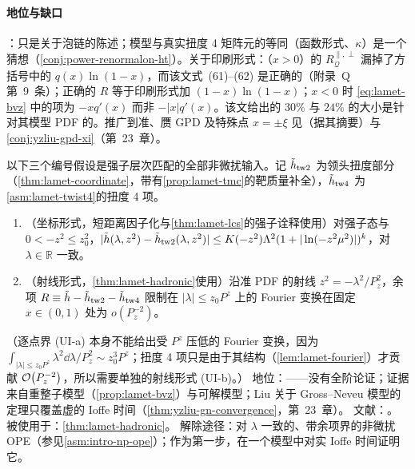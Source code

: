 \paragraph{地位与缺口}
\tagP：只是关于泡链的陈述；模型与真实扭度 4 矩阵元的等同（函数形式、$\kappa$）是一个猜想（\cref{conj:power-renormalon-ht}）。关于印刷形式：\cite[式~(63)--(64)]{Braun:2018brg}（$x>0$）的 $R^{\parallel,\perp}_{\mathcal Q}$ 漏掉了方括号中的 $q(x)\ln(1-x)$，而该文式~(61)--(62) 是正确的（附录~Q 第~9~条）；正确的 $R$ 等于印刷形式加 $(1-x)\ln(1-x)$；$x<0$ 时 \cref{eq:lamet-bvz} 中的项为 $-xq'(x)$ 而非 $-|x|q'(x)$。该文给出的 $30\%$ 与 $24\%$ 的大小是针对其模型 PDF 的。推广到准、赝 GPD 及特殊点 $x=\pm\xi$ 见\cite{Braun:2024snf}（据其摘要）与\cref{conj:yzliu-gpd-xi}（第~23~章）。

以下三个编号假设是强子层次匹配的全部非微扰输入。记 $\tilde h_{\rm tw2}$ 为领头扭度部分（\cref{thm:lamet-coordinate}，带有\cref{prop:lamet-tmc}的靶质量补全），$\tilde h_{\rm tw4}$ 为\cref{asm:lamet-twist4}的扭度 4 项。

\begin{assumption}\label{asm:lamet-uniform}
\begin{enumerate}[label=(UI-\alph*),leftmargin=3.4em,itemsep=1pt,topsep=2pt]
\item （坐标形式，短距离因子化与\cref{thm:lamet-lcs}的强子诠释使用）对强子态与 $0<-z^2\le z_0^2$，$|\tilde h(\lambda,z^2)-\tilde h_{\rm tw2}(\lambda,z^2)|\le K(-z^2)\Lambda^2(1+|\ln(-z^2\mu^2)|)^k$，对 $\lambda\in\mathbb R$ 一致。
\item （射线形式，\cref{thm:lamet-hadronic}使用）沿准 PDF 的射线 $z^2=-\lambda^2/P_z^2$，余项 $R\equiv\tilde h-\tilde h_{\rm tw2}-\tilde h_{\rm tw4}$ 限制在 $|\lambda|\le z_0P^z$ 上的 Fourier 变换在固定 $x\in(0,1)$ 处为 $o(P_z^{-2})$。
\end{enumerate}
（逐点界 (UI-a) 本身不能给出受 $P^z$ 压低的 Fourier 变换，因为 $\int_{|\lambda|\le z_0P^z}\lambda^2\dd\lambda/P_z^2\sim z_0^3P^z$；扭度 4 项只是由于其结构（\cref{lem:lamet-fourier}）才贡献 $\mathcal{O}\!\left(P_z^{-2}\right)$，所以需要单独的射线形式 (UI-b)。）
地位：\tagC——没有全阶论证；证据来自重整子模型（\cref{prop:lamet-bvz}）与可解模型；Liu 关于 Gross--Neveu 模型的定理只覆盖虚的 Ioffe 时间（\cref{thm:yzliu-gn-convergence}，第~23~章）。
文献：\cite{IzubuchiEtAl2018,Braun:2018brg,JiEtAl2021}。
被使用于：\cref{thm:lamet-hadronic}。
解除途径：对 $\lambda$ 一致的、带余项界的非微扰 OPE（参见\cref{asm:intro-np-ope}）；作为第一步，在一个模型中对实 Ioffe 时间证明它。
\end{assumption}

